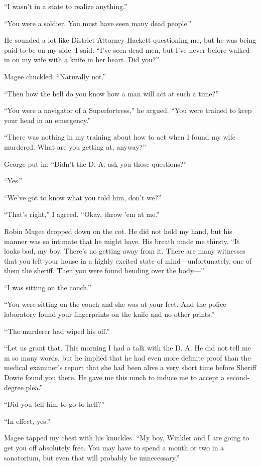 {“I wasn’t in a state to realize anything.”

“You were a soldier. You must have seen many dead people.”

He sounded a lot like District Attorney Hackett questioning me, but he was being paid to be on my side. I said: “I’ve seen dead men, but I’ve never before walked in on my wife with a knife in her heart. Did you?”

Magee chuckled. “Naturally not.”

“Then how the hell do you know how a man will act at such a time?”

“You were a navigator of a Superfortress,” he argued. “You were trained to keep your head in an emergency.”

“There was nothing in my training about how to act when I found my wife murdered. What are you getting at, anyway?”

George put in: “Didn’t the D. A. ask you those questions?”

“Yes.”

“We’ve got to know what you told him, don’t we?”

“That’s right,” I agreed. “Okay, throw ’em at me.”

Robin Magee dropped down on the cot. He did not hold my hand, but his manner was so intimate that he might have. His breath made me thirsty. “It looks bad, my boy. There’s no getting away from it. There are many witnesses that you left your house in a highly excited state of mind—unfortunately, one of them the sheriff. Then you were found bending over the body—”

“I was sitting on the couch.”

“You were sitting on the couch and she was at your feet. And the police laboratory found your fingerprints on the knife and no other prints.”

‘‘The murderer had wiped his off.”

“Let us grant that. This morning I had a talk with the D. A. He did not tell me m so many words, but he implied that he had even more definite proof than the medical examiner’s report that she had been alive a very short time before Sheriff Dowie found you there. He gave me this much to induce me to accept a second-degree plea.”

“Did you tell him to go to hell?”

“In effect, yes.”

Magee tapped my chest with his knuckles. “My boy, Winkler and I are going to get you off absolutely free. You may have to spend a month or two in a sanatorium, but even that will probably be unnecessary.”

}
